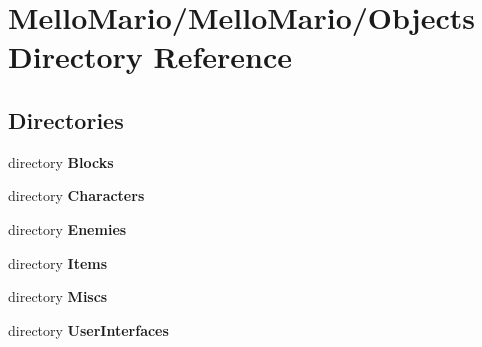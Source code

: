\section{Mello\+Mario/\+Mello\+Mario/\+Objects Directory Reference}
\label{dir_f1c43aa2dc40ba5ee13d7de471e9d46f}
\subsection*{Directories}
\begin{DoxyCompactItemize}
\item 
directory \textbf{ Blocks}
\item 
directory \textbf{ Characters}
\item 
directory \textbf{ Enemies}
\item 
directory \textbf{ Items}
\item 
directory \textbf{ Miscs}
\item 
directory \textbf{ User\+Interfaces}
\end{DoxyCompactItemize}
